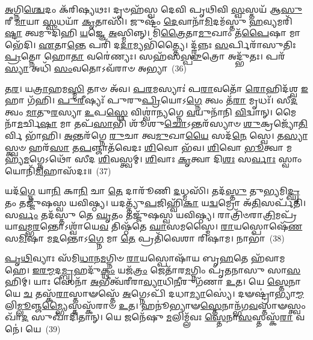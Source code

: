 \-\ul{𑌅}\-𑌗𑍍𑌨𑌿\-\ul{𑌶𑍍𑌚𑍇}\-𑌦𑌂 𑌕᳴𑌰𑌿𑌷𑍍𑌯𑌥𑌃। 𑌦𑍃𑍞𑌹᳴𑌸𑍍𑌵 𑌦𑍇𑌵𑌿 𑌪𑍃𑌥𑌿𑌵𑌿 \ul{𑌸𑍍𑌵}\-𑌸𑍍𑌤𑌯᳴ 𑌆\-\ul{𑌸𑍁}\-𑌰𑍀 \ul{𑌮𑌾}\-𑌯𑌾 \ul{𑌸𑍍𑌵}\-𑌧𑌯𑌾᳴ \ul{𑌕𑍃}\-𑌤𑌾𑌸𑌿᳴। 𑌜𑍁𑌷𑍍𑌟𑌂᳴ \ul{𑌦𑍇}\-𑌵𑌾𑌨𑌾᳴\-\ul{𑌮𑌿}\-𑌦𑌮᳴𑌸𑍍𑌤𑍁 \ul{𑌹}\-𑌵𑍍𑌯𑌮𑌰𑌿᳴\-\ul{𑌷𑍍𑌟𑌾} 𑌤𑍍𑌵𑌮𑍁𑌦𑌿᳴𑌹𑌿 \ul{𑌯}\-𑌜𑍍𑌞𑍇 \ul{𑌅}\-𑌸𑍍𑌮𑌿𑌨𑍍𑌨𑍍। 𑌮𑌿\-\ul{𑌤𑍍𑌰𑍈}\-𑌤𑌾\-\ul{𑌮𑍁}\-𑌖𑌾𑌂 𑌤᳴\-\ul{𑌪𑍈}\-𑌷𑌾 𑌮𑌾 𑌭𑍇᳴𑌦𑌿। \ul{𑌏}\-𑌤𑌾\-\ul{𑌨𑍍𑌤𑍇} 𑌪𑌰𑌿᳴ 𑌦\-\ul{𑌦𑌾}\-𑌮𑍍𑌯𑌭𑌿᳴𑌤𑍍𑌤𑍍𑌯𑍈। 𑌦𑍍𑌰𑍍𑌵᳴𑌨𑍍𑌨𑌃 \ul{𑌸}\-𑌰𑍍𑌪𑌿𑌰𑌾᳴𑌸𑍁𑌤𑌿𑌃 \ul{𑌪𑍍𑌰}\-𑌤𑍍𑌨𑍋 𑌹𑍋\-\ul{𑌤𑌾} 𑌵𑌰𑍇॑𑌣𑍍𑌯𑌃। 𑌸𑌹᳴𑌸\-\ul{𑌸𑍍𑌪𑍁}\-𑌤𑍍𑌰𑍋 𑌅𑌦𑍍𑌭𑍁᳴𑌤𑌃। 𑌪𑌰᳴\-\ul{𑌸𑍍𑌯𑌾} 𑌅𑌧𑌿᳴ \ul{𑌸𑌂}\-𑌵𑌤𑍋\-𑌽𑌵᳴𑌰𑌾𑍞 𑌅𑌭𑍍𑌯𑌾~(36)

\-\ul{𑌤}\-\-\ul{𑌰}\-। 𑌯\-\ul{𑌤𑍍𑌰𑌾}\-𑌹𑌮\-\ul{𑌸𑍍𑌮𑌿} 𑌤𑌾𑍞 𑌅᳴𑌵। \ul{𑌪}\-\-\ul{𑌰}\-𑌮𑌸𑍍𑌯𑌾𑌃॑ 𑌪\-\ul{𑌰𑌾}\-𑌵𑌤𑍋᳴ \ul{𑌰𑍋}\-𑌹𑌿𑌦᳴𑌶𑍍𑌵 \ul{𑌇}\-𑌹𑌾 𑌗᳴𑌹𑌿। \ul{𑌪𑍁}\-\-\ul{𑌰𑍀}\-𑌷𑍍𑌯𑌃᳴ 𑌪𑍁𑌰𑍁\-\ul{𑌪𑍍𑌰𑌿}\-𑌯𑍋\-𑌽\-\ul{𑌗𑍍𑌨𑍇} 𑌤𑍍𑌵𑌂 𑌤᳴\-\ul{𑌰𑌾} 𑌮𑍃𑌧𑌃᳴। 𑌸𑍀\-\ul{𑌦} 𑌤𑍍𑌵𑌂 \ul{𑌮𑌾}\-𑌤𑍁\-\ul{𑌰}\-𑌸𑍍𑌯𑌾 \ul{𑌉}\-𑌪\-\ul{𑌸𑍍𑌥𑍇} 𑌵𑌿𑌶𑍍𑌵𑌾॑𑌨𑍍𑌯𑌗𑍍𑌨𑍇 \ul{𑌵}\-𑌯𑍁𑌨𑌾᳴𑌨𑌿 \ul{𑌵𑌿}\-𑌦𑍍𑌵𑌾𑌨𑍍। 𑌮𑍈𑌨𑌾᳴\-\ul{𑌮}\-𑌰𑍍𑌚𑌿\-\ul{𑌷𑌾} 𑌮𑌾 𑌤𑌪᳴\-\ul{𑌸𑌾}\-𑌭𑌿 𑌶𑍂᳴𑌶𑍁\-\ul{𑌚𑍋}\-\-𑌽𑌨𑍍𑌤𑌰᳴𑌸𑍍𑌯𑌾𑍞 \ul{𑌶𑍁}\-𑌕𑍍𑌰𑌜𑍍𑌯𑍋᳴\-\ul{𑌤𑌿}\-𑌰𑍍𑌵𑌿 𑌭𑌾᳴𑌹𑌿। \ul{𑌅}\-𑌨𑍍𑌤𑌰᳴𑌗𑍍𑌨𑍇 \ul{𑌰𑍁}\-𑌚𑌾 𑌤𑍍𑌵\-\ul{𑌮𑍁}\-𑌖𑌾\-\ul{𑌯𑍈} 𑌸𑌦᳴\-\ul{𑌨𑍇} 𑌸𑍍𑌵𑍇। 𑌤\-\ul{𑌸𑍍𑌯𑌾}\-𑌸𑍍𑌤𑍍𑌵𑍞 𑌹𑌰᳴\-\ul{𑌸𑌾} 𑌤\-\ul{𑌪}\-𑌞𑍍𑌜𑌾𑌤᳴𑌵𑍇𑌦𑌃 \ul{𑌶𑌿}\-𑌵𑍋 𑌭᳴𑌵। \ul{𑌶𑌿}\-𑌵𑍋 \ul{𑌭𑍂}\-𑌤𑍍𑌵𑌾 𑌮𑌹𑍍𑌯᳴\-\ul{𑌮}\-𑌗𑍍𑌨𑍇\-𑌽𑌥𑍋᳴ 𑌸𑍀𑌦 \ul{𑌶𑌿}\-𑌵𑌸𑍍𑌤𑍍𑌵𑌮𑍍। \ul{𑌶𑌿}\-𑌵𑌾𑌃 \ul{𑌕𑍃}\-𑌤𑍍𑌵𑌾 𑌦𑌿\-\ul{𑌶𑌃} 𑌸\-\ul{𑌰𑍍𑌵𑌾𑌃} 𑌸𑍍𑌵𑌾𑌂 𑌯𑍋𑌨𑌿᳴\-\ul{𑌮𑌿}\-𑌹𑌾𑌸᳴𑌦𑌃॥~(37)

{\anuvakamend[{\-\ul{𑌵𑍀}\-𑌰\-\ul{𑌯}\-𑌸𑍍𑌵𑌾 𑌤𑌪᳴𑌨𑍍𑌵𑌿𑍞\-\ul{𑌶}\-𑌤𑌿𑌶𑍍𑌚᳴}]}%

𑌯𑌦᳴\-\ul{𑌗𑍍𑌨𑍇} 𑌯𑌾\-\ul{𑌨𑌿} 𑌕𑌾\-\ul{𑌨𑌿} 𑌚𑌾 \ul{𑌤𑍇} 𑌦𑌾𑌰𑍂᳴𑌣𑌿 \ul{𑌦}\-𑌧𑍍𑌮𑌸𑌿᳴। 𑌤𑌦᳴\-\ul{𑌸𑍍𑌤𑍁} 𑌤𑍁\-\ul{𑌭𑍍𑌯}\-𑌮𑌿\-\ul{𑌦𑍍𑌘𑍃}\-𑌤𑌂 𑌤𑌜𑍍𑌜𑍁᳴𑌷𑌸𑍍𑌵 𑌯𑌵𑌿𑌷𑍍𑌠𑍍𑌯। 𑌯𑌦𑌤𑍍𑌤𑍍𑌯𑍁᳴\-\ul{𑌪}\-𑌜𑌿𑌹𑍍𑌵𑌿᳴\-\ul{𑌕𑌾} 𑌯\-\ul{𑌦𑍍𑌵}\-𑌮𑍍𑌰𑍋 𑌅᳴\-\ul{𑌤𑌿}\-𑌸𑌰𑍍𑌪᳴𑌤𑌿। 𑌸\-\ul{𑌰𑍍𑌵𑌂} 𑌤𑌦᳴𑌸𑍍𑌤𑍁 𑌤𑍇 \ul{𑌘𑍃}\-𑌤𑌂 𑌤𑌜𑍍𑌜𑍁᳴𑌷𑌸𑍍𑌵 𑌯𑌵𑌿𑌷𑍍𑌠𑍍𑌯। 𑌰𑌾𑌤𑍍𑌰𑌿᳴𑍞𑌰𑌾\-\ul{𑌤𑍍𑌰𑌿}\-𑌮𑌪𑍍𑌰᳴𑌯𑌾\-\ul{𑌵}\-𑌮𑍍𑌭\-\ul{𑌰}\-𑌨𑍍𑌤𑍋\-𑌽𑌶𑍍𑌵𑌾᳴𑌯𑍇\-\ul{𑌵} 𑌤𑌿𑌷𑍍𑌠᳴𑌤𑍇 \ul{𑌘𑌾}\-𑌸𑌮𑌸𑍍𑌮𑍈। \ul{𑌰𑌾}\-𑌯𑌸𑍍𑌪𑍋𑌷𑍇᳴\-\ul{𑌣} 𑌸\-\ul{𑌮𑌿}\-𑌷𑌾 𑌮\-\ul{𑌦}\-𑌨𑍍𑌤𑍋\-𑌽\-\ul{𑌗𑍍𑌨𑍇} 𑌮𑌾 \ul{𑌤𑍇} 𑌪𑍍𑌰𑌤𑌿᳴𑌵𑍇𑌶𑌾 𑌰𑌿𑌷𑌾𑌮। 𑌨𑌾𑌭𑌾॑~(38)

\-\ul{𑌪𑍃}\-\-\ul{𑌥𑌿}\-𑌵𑍍𑌯𑌾𑌃 𑌸᳴𑌮𑌿\-\ul{𑌧𑌾}\-𑌨\-\ul{𑌮}\-𑌗𑍍𑌨𑌿𑍞 \ul{𑌰𑌾}\-𑌯𑌸𑍍𑌪𑍋𑌷𑌾᳴𑌯 𑌬𑍃\-\ul{𑌹}\-𑌤𑍇 𑌹᳴𑌵𑌾𑌮𑌹𑍇। \ul{𑌇}\-\-\ul{𑌰}\-\-\ul{𑌮𑍍𑌮}\-𑌦\-\ul{𑌮𑍍𑌬𑍃}\-𑌹𑌦𑍁᳴\-\ul{𑌕𑍍𑌥𑌂} 𑌯𑌜᳴\-\ul{𑌤𑍍𑌰𑌂} 𑌜𑍇𑌤𑌾᳴𑌰\-\ul{𑌮}\-𑌗𑍍𑌨𑌿𑌂 𑌪𑍃᳴𑌤𑌨𑌾𑌸𑍁 𑌸𑌾\-\ul{𑌸}\-𑌹𑌿𑌮𑍍। 𑌯𑌾𑌃 𑌸𑍇𑌨𑌾᳴ \ul{𑌅}\-𑌭𑍀𑌤𑍍𑌵᳴𑌰𑍀𑌰𑌾\-\ul{𑌵𑍍𑌯𑌾}\-𑌧𑌿\-\ul{𑌨𑍀}\-𑌰𑍁𑌗᳴𑌣𑌾 \ul{𑌉}\-𑌤। 𑌯𑍇 \ul{𑌸𑍍𑌤𑍇}\-𑌨𑌾 𑌯𑍇 \ul{𑌚} 𑌤𑌸𑍍𑌕᳴\-\ul{𑌰𑌾}\-𑌸𑍍𑌤𑌾𑍟𑌸𑍍𑌤𑍇᳴ \ul{𑌅}\-𑌗𑍍𑌨𑍇\-𑌽𑌪𑌿᳴ 𑌦𑌧𑌾\-\ul{𑌮𑍍𑌯𑌾}\-𑌸𑍍𑌯𑍇॑। 𑌦𑍟𑌷𑍍𑌟𑍍𑌰𑌾॑𑌭𑍍𑌯𑌾\-\ul{𑌮𑍍𑌮}\-𑌲𑌿\-\ul{𑌮𑍍𑌲𑍂}\-𑌞𑍍𑌜\-\ul{𑌮𑍍𑌭𑍍𑌯𑍈}\-𑌸𑍍𑌤𑌸𑍍𑌕᳴𑌰𑌾𑍞 \ul{𑌉}\-𑌤। 𑌹𑌨𑍂॑𑌭𑍍𑌯𑌾𑍟\-\ul{𑌸𑍍𑌤𑍇}\-𑌨𑌾𑌨𑍍𑌭᳴𑌗\-\ul{𑌵}\-𑌸𑍍𑌤𑌾𑍟𑌸𑍍𑌤𑍍𑌵𑌂 𑌖𑌾᳴\-\ul{𑌦} 𑌸𑍁𑌖𑌾᳴𑌦𑌿𑌤𑌾𑌨𑍍। 𑌯𑍇 𑌜𑌨𑍇᳴𑌷𑍁 \ul{𑌮}\-𑌲𑌿𑌮𑍍𑌲᳴𑌵𑌃 \ul{𑌸𑍍𑌤𑍇}\-𑌨𑌾\-\ul{𑌸}\-𑌸𑍍𑌤𑌸𑍍𑌕᳴\-\ul{𑌰𑌾} 𑌵𑌨𑍇॑। 𑌯𑍇~(39)

